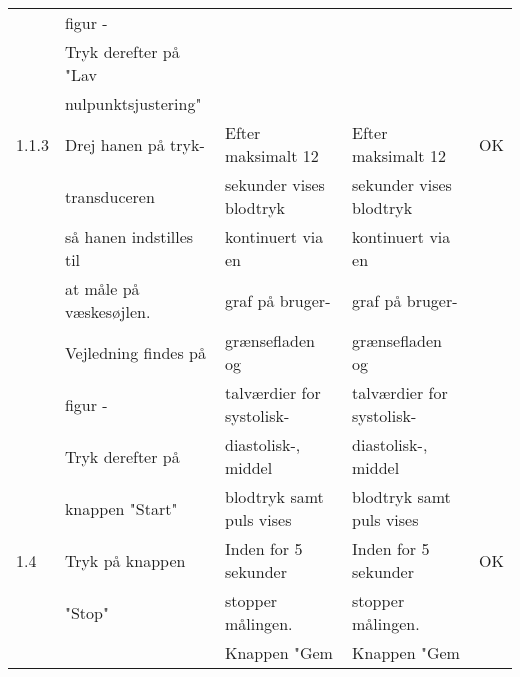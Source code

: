 \begin{table}[h!]
\begin{tabular}{lllll}
		\multicolumn{1}{l|}{} & \multicolumn{1}{l|}{figur -} & \multicolumn{1}{l|}{} & \multicolumn{1}{l|}{} &  \\
		\multicolumn{1}{l|}{} & \multicolumn{1}{l|}{Tryk derefter på "Lav} & \multicolumn{1}{l|}{} & \multicolumn{1}{l|}{} &  \\
		\multicolumn{1}{l|}{} & \multicolumn{1}{l|}{nulpunktsjustering"} & \multicolumn{1}{l|}{} & \multicolumn{1}{l|}{} &  \\ \hline
		\multicolumn{1}{l|}{1.1.3} & \multicolumn{1}{l|}{Drej hanen på tryk-} & \multicolumn{1}{l|}{Efter maksimalt 12} & \multicolumn{1}{l|}{Efter maksimalt 12} & OK \\
		\multicolumn{1}{l|}{} & \multicolumn{1}{l|}{transduceren} & \multicolumn{1}{l|}{sekunder vises blodtryk} & \multicolumn{1}{l|}{sekunder vises blodtryk} &  \\
		\multicolumn{1}{l|}{} & \multicolumn{1}{l|}{så hanen indstilles til} & \multicolumn{1}{l|}{kontinuert via en} & \multicolumn{1}{l|}{kontinuert via en} &  \\
		\multicolumn{1}{l|}{} & \multicolumn{1}{l|}{at måle på væskesøjlen.} & \multicolumn{1}{l|}{graf på bruger-} & \multicolumn{1}{l|}{graf på bruger-} &  \\
		\multicolumn{1}{l|}{} & \multicolumn{1}{l|}{Vejledning findes på} & \multicolumn{1}{l|}{grænsefladen og} & \multicolumn{1}{l|}{grænsefladen og} &  \\
		\multicolumn{1}{l|}{} & \multicolumn{1}{l|}{figur -} & \multicolumn{1}{l|}{talværdier for systolisk-} & \multicolumn{1}{l|}{talværdier for systolisk-} &  \\
		\multicolumn{1}{l|}{} & \multicolumn{1}{l|}{Tryk derefter på} & \multicolumn{1}{l|}{diastolisk-, middel} & \multicolumn{1}{l|}{diastolisk-, middel} &  \\
		\multicolumn{1}{l|}{} & \multicolumn{1}{l|}{knappen "Start"} & \multicolumn{1}{l|}{blodtryk samt puls vises} & \multicolumn{1}{l|}{blodtryk samt puls vises} &  \\ \hline
		\multicolumn{1}{l|}{1.4} & \multicolumn{1}{l|}{Tryk på knappen} & \multicolumn{1}{l|}{Inden for 5 sekunder} & \multicolumn{1}{l|}{Inden for 5 sekunder} & OK \\
		\multicolumn{1}{l|}{} & \multicolumn{1}{l|}{"Stop"} & \multicolumn{1}{l|}{stopper målingen.} & \multicolumn{1}{l|}{stopper målingen.} &  \\
		\multicolumn{1}{l|}{} & \multicolumn{1}{l|}{} & \multicolumn{1}{l|}{Knappen "Gem} & \multicolumn{1}{l|}{Knappen "Gem} &  \\

\end{tabular}
\end{table}
